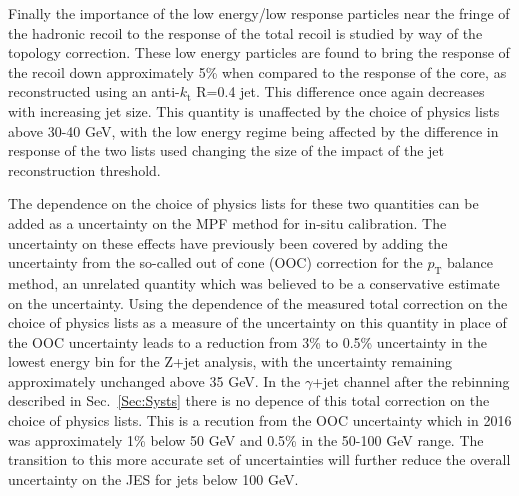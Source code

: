 Finally the importance of the low energy/low response particles near the fringe of the hadronic recoil to the response of the total recoil is studied by way of the topology correction.  
These low energy particles are found to bring the response of the recoil down approximately 5\% when compared to the response of the core, as reconstructed using an anti-$k_\mathrm{t}$ R=0.4 jet.  
This difference once again decreases with increasing jet size.  
This quantity is unaffected by the choice of physics lists above 30-40 GeV, with the low energy regime being affected by the difference in response of the two lists used changing the size of the impact of the jet reconstruction threshold.  

The dependence on the choice of physics lists for these two quantities can be added as a uncertainty on the MPF method for in-situ calibration.  
The uncertainty on these effects have previously been covered by adding the uncertainty from the so-called out of cone (OOC) correction for the $p_{\mathrm{T}}$ balance method, an unrelated quantity which was believed to be a conservative estimate on the uncertainty.  
Using the dependence of the measured total correction on the choice of physics lists as a measure of the uncertainty on this quantity in place of the OOC uncertainty leads to a reduction from 3\% to 0.5\% uncertainty in the lowest energy bin for the Z+jet analysis, with the uncertainty remaining approximately unchanged above 35 GeV.  
In the $\gamma$+jet channel after the rebinning described in Sec.~\ref{Sec:Systs} there is no depence of this total correction on the choice of physics lists.  
This is a recution from the OOC uncertainty which in 2016 was approximately 1\% below 50 GeV and 0.5\% in the 50-100 GeV range.  
The transition to this more accurate set of uncertainties will further reduce the overall uncertainty on the JES for jets below 100 GeV.  
 



